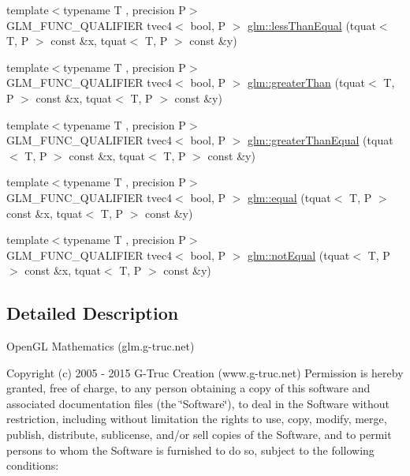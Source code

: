 \begin{DoxyCompactItemize}
\item 
{\footnotesize template$<$typename T , precision P$>$ }\\G\-L\-M\-\_\-\-F\-U\-N\-C\-\_\-\-Q\-U\-A\-L\-I\-F\-I\-E\-R tvec4$<$ bool, P $>$ \hyperlink{group__gtc__quaternion_ga7c81996ed2724f26fe76faf352c76294}{glm\-::less\-Than\-Equal} (tquat$<$ T, P $>$ const \&x, tquat$<$ T, P $>$ const \&y)
\item 
{\footnotesize template$<$typename T , precision P$>$ }\\G\-L\-M\-\_\-\-F\-U\-N\-C\-\_\-\-Q\-U\-A\-L\-I\-F\-I\-E\-R tvec4$<$ bool, P $>$ \hyperlink{group__gtc__quaternion_ga09d21a588ae425ac7517ea65cc59a5ae}{glm\-::greater\-Than} (tquat$<$ T, P $>$ const \&x, tquat$<$ T, P $>$ const \&y)
\item 
{\footnotesize template$<$typename T , precision P$>$ }\\G\-L\-M\-\_\-\-F\-U\-N\-C\-\_\-\-Q\-U\-A\-L\-I\-F\-I\-E\-R tvec4$<$ bool, P $>$ \hyperlink{group__gtc__quaternion_ga0906a221a2037519fcf316ea5c1e3b3e}{glm\-::greater\-Than\-Equal} (tquat$<$ T, P $>$ const \&x, tquat$<$ T, P $>$ const \&y)
\item 
{\footnotesize template$<$typename T , precision P$>$ }\\G\-L\-M\-\_\-\-F\-U\-N\-C\-\_\-\-Q\-U\-A\-L\-I\-F\-I\-E\-R tvec4$<$ bool, P $>$ \hyperlink{group__gtc__quaternion_gac187115710365e0b2902220b9611e7b6}{glm\-::equal} (tquat$<$ T, P $>$ const \&x, tquat$<$ T, P $>$ const \&y)
\item 
{\footnotesize template$<$typename T , precision P$>$ }\\G\-L\-M\-\_\-\-F\-U\-N\-C\-\_\-\-Q\-U\-A\-L\-I\-F\-I\-E\-R tvec4$<$ bool, P $>$ \hyperlink{group__gtc__quaternion_ga484c4633f7c05d8e29ee8b452350f539}{glm\-::not\-Equal} (tquat$<$ T, P $>$ const \&x, tquat$<$ T, P $>$ const \&y)
\end{DoxyCompactItemize}


\subsection{Detailed Description}
Open\-G\-L Mathematics (glm.\-g-\/truc.\-net)

Copyright (c) 2005 -\/ 2015 G-\/\-Truc Creation (www.\-g-\/truc.\-net) Permission is hereby granted, free of charge, to any person obtaining a copy of this software and associated documentation files (the \char`\"{}\-Software\char`\"{}), to deal in the Software without restriction, including without limitation the rights to use, copy, modify, merge, publish, distribute, sublicense, and/or sell copies of the Software, and to permit persons to whom the Software is furnished to do so, subject to the following conditions\-:

